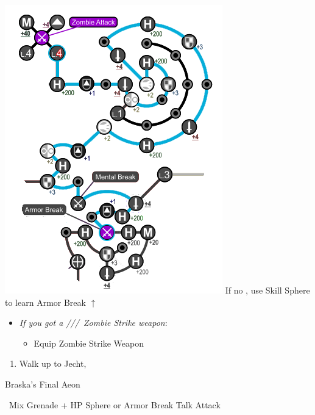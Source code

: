 \begin{spheregrid}
\begin{multicols}{2}
\begin{itemize}
			\includegraphics[width=.8\columnwidth]{graphics/Tidus_BFA}
			\rikkuf If no \od, use Skill Sphere to learn Armor Break $\uparrow$
		\end{itemize}
	\end{multicols}
\end{spheregrid}
\colstart
	\begin{equip}
		\begin{itemize}
			\item \textit{If you got a \lulu/\kimahri/\wakka/\rikku\ Zombie Strike weapon}:
				\begin{itemize}
					\item Equip Zombie Strike Weapon
				\end{itemize}
		\end{itemize}
	\end{equip}
	\begin{enumerate}[resume]
		\item Walk up to Jecht, \cs[4:30]
	\end{enumerate}
	\bothvfill\winvfill\lossvfill
	\begin{battle}[180000]{Braska's Final Aeon}
		\begin{itemize}
			\switch{\yuna}{\rikku}
			\rikkuf \od\ Mix Grenade + HP Sphere or Armor Break
			\tidusf Talk
			\switch{\auron}{\yuna}
			\summon{\bahamut}
			\bahamutf Attack
		\end{itemize}
	\end{battle}
